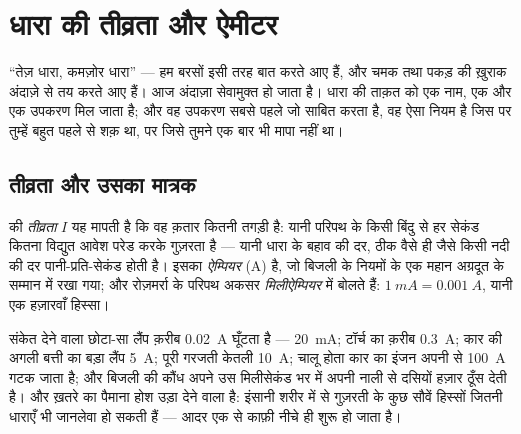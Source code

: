 \chapter{धारा की तीव्रता और ऐमीटर}\label{ch:g8:intensity-ammeter}

``तेज़ धारा, कमज़ोर धारा'' --- हम बरसों इसी तरह बात करते आए हैं, और
चमक तथा पकड़ की ख़ुराक अंदाज़े से तय करते आए हैं। आज अंदाज़ा सेवामुक्त
हो जाता है। धारा की ताक़त को एक नाम, एक  और एक उपकरण मिल जाता
है; और वह उपकरण सबसे पहले जो साबित करता है, वह ऐसा नियम है जिस पर
तुम्हें बहुत पहले से शक़ था, पर जिसे तुमने एक बार भी मापा नहीं था।

\section{तीव्रता और उसका मात्रक}

\begin{definition}[तीव्रता]\label{def:g8:intensity-ammeter:intensity}
 की \emph{तीव्रता} $I$ यह मापती है कि वह
क़तार कितनी तगड़ी है: यानी परिपथ के किसी बिंदु से हर सेकंड कितना
विद्युत आवेश परेड करके गुज़रता है --- यानी धारा के बहाव की दर, ठीक
वैसे ही जैसे किसी नदी की दर पानी-प्रति-सेकंड होती है। इसका 
\emph{ऐम्पियर} (\unit{A}) है, जो बिजली के नियमों के एक
महान अग्रदूत के सम्मान में रखा गया; और रोज़मर्रा के परिपथ अकसर
\emph{मिलीऐम्पियर} में बोलते हैं: $\qty{1}{mA} = \qty{0.001}{A}$,
यानी एक हज़ारवाँ हिस्सा।
\end{definition}

\begin{example}[देखते ही पहचान लेने लायक ऐम्पियर]\label{ex:g8:intensity-ammeter:values}
संकेत देने वाला छोटा-सा लैंप क़रीब \qty{0.02}{A} घूँटता है ---
\qty{20}{mA}; टॉर्च का  क़रीब \qty{0.3}{A}; कार की अगली बत्ती का
बड़ा लैंप \qty{5}{A}; पूरी गरजती केतली \qty{10}{A}; चालू होता कार का
इंजन अपनी  से \qty{100}{A} गटक जाता है; और बिजली की कौंध अपने उस
मिलीसेकंड भर में अपनी नाली से दसियों हज़ार  ठूँस देती है। और
ख़तरे का पैमाना होश उड़ा देने वाला है: इंसानी शरीर में से गुज़रती
 के कुछ सौवें हिस्सों जितनी धाराएँ भी जानलेवा हो सकती हैं ---
आदर एक  से काफ़ी नीचे ही शुरू हो जाता है।
\end{example}

